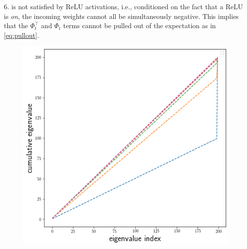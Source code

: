 $6.$  is not satisfied by ReLU activations, i.e., conditioned on the fact that a ReLU is \emph{on}, the incoming weights cannot all be simultaneously negative. This implies that the $\Phi^\top_t$ and $\Phi_t$ terms cannot be pulled out of the expectation as in \eqref{eq:pullout}.\\
\begin{figure}
\includegraphics[scale=0.22]{figs/dgn-fra-ecdf-ideal.png}
\end{figure}
